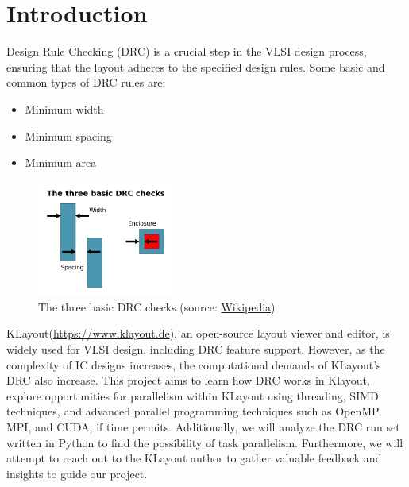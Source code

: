 \documentclass[sigconf]{acmart}
\begin{document}

\maketitle

\section{Introduction}
Design Rule Checking (DRC) is a crucial step in the VLSI design process, ensuring that the layout adheres to the specified design rules. Some basic and common types of DRC rules are:

\begin{itemize}
\item Minimum width
\item Minimum spacing 
\item Minimum area 
\end{itemize}


\begin{figure}[h]
  \centering
  \includegraphics[width=0.4\textwidth]{600px-The_three_basic_DRC_checks.png}
  \caption{The three basic DRC checks (source: \href{https://upload.wikimedia.org/wikipedia/commons/thumb/5/5a/The_three_basic_DRC_checks.svg/600px-The_three_basic_DRC_checks.svg.png}{Wikipedia})}
  \label{fig:basic_drc_checks}
\end{figure}

KLayout(\href{https://www.klayout.de/}{https://www.klayout.de}), an open-source layout viewer and editor, is widely used for VLSI design, including DRC feature support. However, as the complexity of IC designs increases, the computational demands of KLayout's DRC also increase. This project aims to learn how DRC works in Klayout, explore opportunities for parallelism within KLayout using threading, SIMD techniques, and advanced parallel programming techniques such as OpenMP, MPI, and CUDA, if time permits. Additionally, we will analyze the DRC run set written in Python to find the possibility of task parallelism. Furthermore, we will attempt to reach out to the KLayout author to gather valuable feedback and insights to guide our project.
\end{document}
